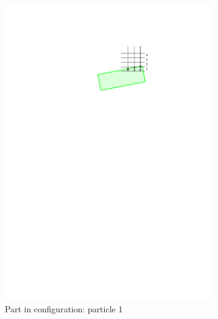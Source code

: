 \documentclass[letterpaper, 10 pt, conference]{ieeeconf}
\begin{document}
\begin{figure}
    \hfill
    \begin{subfigure}[b]{0.2\linewidth}
        \includegraphics[width=\textwidth, clip, trim=4.2in 8.4in 2.5in 1.7in]{bins_p1}
        \caption{Part in configuration: particle 1}
        \label{bins:p1}
    \end{subfigure}
    \hfill
    \begin{subfigure}[b]{0.2\linewidth}

\end{subfigure}
\end{figure}
\end{document}
